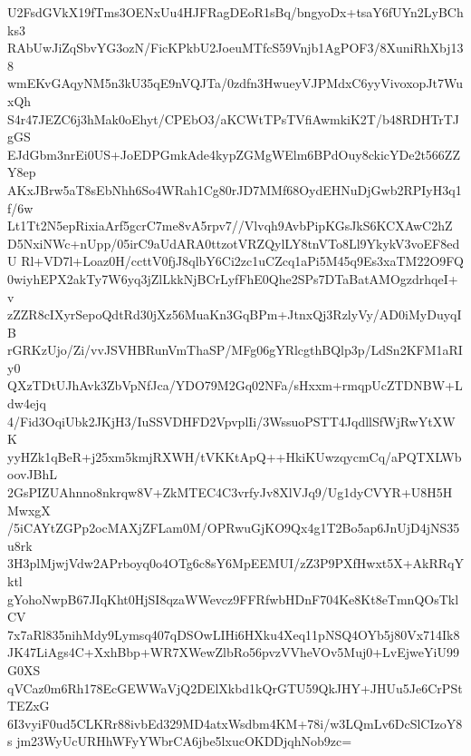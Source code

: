 U2FsdGVkX19fTms3OENxUu4HJFRagDEoR1sBq/bngyoDx+tsaY6fUYn2LyBChks3
RAbUwJiZqSbvYG3ozN/FicKPkbU2JoeuMTfcS59Vnjb1AgPOF3/8XuniRhXbj138
wmEKvGAqyNM5n3kU35qE9nVQJTa/0zdfn3HwueyVJPMdxC6yyVivoxopJt7WuxQh
S4r47JEZC6j3hMak0oEhyt/CPEbO3/aKCWtTPsTVfiAwmkiK2T/b48RDHTrTJgGS
EJdGbm3nrEi0US+JoEDPGmkAde4kypZGMgWElm6BPdOuy8ckicYDe2t566ZZY8ep
AKxJBrw5aT8sEbNhh6So4WRah1Cg80rJD7MMf68OydEHNuDjGwb2RPIyH3q1f/6w
Lt1Tt2N5epRixiaArf5gcrC7me8vA5rpv7//Vlvqh9AvbPipKGsJkS6KCXAwC2hZ
D5NxiNWc+nUpp/05irC9aUdARA0ttzotVRZQylLY8tnVTo8Ll9YkykV3voEF8edU
Rl+VD7l+Loaz0H/ccttV0fjJ8qlbY6Ci2zc1uCZcq1aPi5M45q9Es3xaTM22O9FQ
0wiyhEPX2akTy7W6yq3jZlLkkNjBCrLyfFhE0Qhe2SPs7DTaBatAMOgzdrhqeI+v
zZZR8cIXyrSepoQdtRd30jXz56MuaKn3GqBPm+JtnxQj3RzlyVy/AD0iMyDuyqIB
rGRKzUjo/Zi/vvJSVHBRunVmThaSP/MFg06gYRlcgthBQlp3p/LdSn2KFM1aRIy0
QXzTDtUJhAvk3ZbVpNfJca/YDO79M2Gq02NFa/sHxxm+rmqpUcZTDNBW+Ldw4ejq
4/Fid3OqiUbk2JKjH3/IuSSVDHFD2VpvplIi/3WssuoPSTT4JqdllSfWjRwYtXWK
yyHZk1qBeR+j25xm5kmjRXWH/tVKKtApQ++HkiKUwzqycmCq/aPQTXLWboovJBhL
2GsPIZUAhnno8nkrqw8V+ZkMTEC4C3vrfyJv8XlVJq9/Ug1dyCVYR+U8H5HMwxgX
/5iCAYtZGPp2ocMAXjZFLam0M/OPRwuGjKO9Qx4g1T2Bo5ap6JnUjD4jNS35u8rk
3H3plMjwjVdw2APrboyq0o4OTg6c8sY6MpEEMUI/zZ3P9PXfHwxt5X+AkRRqYktl
gYohoNwpB67JIqKht0HjSI8qzaWWevcz9FFRfwbHDnF704Ke8Kt8eTmnQOsTklCV
7x7aRl835nihMdy9Lymsq407qDSOwLIHi6HXku4Xeq11pNSQ4OYb5j80Vx714Ik8
JK47LiAgs4C+XxhBbp+WR7XWewZlbRo56pvzVVheVOv5Muj0+LvEjweYiU99G0XS
qVCaz0m6Rh178EcGEWWaVjQ2DElXkbd1kQrGTU59QkJHY+JHUu5Je6CrPStTEZxG
6I3vyiF0ud5CLKRr88ivbEd329MD4atxWsdbm4KM+78i/w3LQmLv6DcSlCIzoY8s
jm23WyUcURHhWFyYWbrCA6jbe5lxucOKDDjqhNob9zc=
